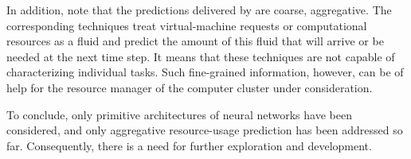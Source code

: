 In addition, note that the predictions delivered by \cite{dabbagh2015,
ismaeel2015, cao2014} are coarse, aggregative. The corresponding techniques
treat virtual-machine requests or computational resources as a fluid and predict
the amount of this fluid that will arrive or be needed at the next time step. It
means that these techniques are not capable of characterizing individual tasks.
Such fine-grained information, however, can be of help for the resource manager
of the computer cluster under consideration.

To conclude, only primitive architectures of neural networks have been
considered, and only aggregative resource-usage prediction has been addressed so
far. Consequently, there is a need for further exploration and development.
